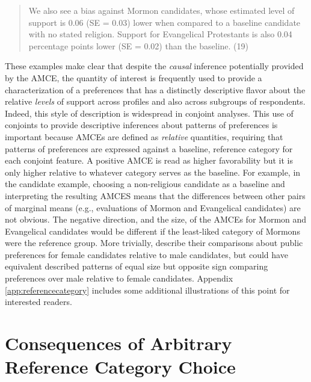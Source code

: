 \documentclass[a4paper,12pt]{article}\usepackage[]{graphicx}\usepackage[]{color}
\begin{document}
\begin{quote}
We also see a bias against Mormon candidates, whose estimated level of support is 0.06 (SE = 0.03) lower when compared to a baseline candidate with no stated religion. Support for Evangelical Protestants is also 0.04 percentage points lower (SE = 0.02) than the baseline. (19)
\end{quote}

\noindent These examples make clear that despite the \textit{causal} inference potentially provided by the AMCE, the quantity of interest is frequently used to provide a characterization of a preferences that has a distinctly descriptive flavor about the relative \textit{levels} of support across profiles and also across subgroups of respondents. Indeed, this style of description is widespread in conjoint analyses. This use of conjoints to provide descriptive inferences about patterns of preferences is important because AMCEs are defined as \textit{relative} quantities, requiring that patterns of preferences are expressed against a baseline, reference category for each conjoint feature. A positive AMCE is read as higher favorability but it is only higher relative to whatever category serves as the baseline. For example, in the \citeauthor{HainmuellerHopkinsYamamoto2014} candidate example, choosing a non-religious candidate as a baseline and interpreting the resulting AMCES means that the differences between other pairs of marginal means (e.g., evaluations of Mormon and Evangelical candidates) are not obvious. The negative direction, and the size, of the AMCEs for Mormon and Evangelical candidates would be different if the least-liked category of Mormons were the reference group. More trivially, \citet{TeeleKallaRosenbluth2018} describe their comparisons about public preferences for female candidates relative to male candidates, but could have equivalent described patterns of equal size but opposite sign comparing preferences over male relative to female candidates. Appendix \ref{app:referencecategory} includes some additional illustrations of this point for interested readers.

\section*{Consequences of Arbitrary Reference Category Choice}\label{sec:challenges}
\end{document}

